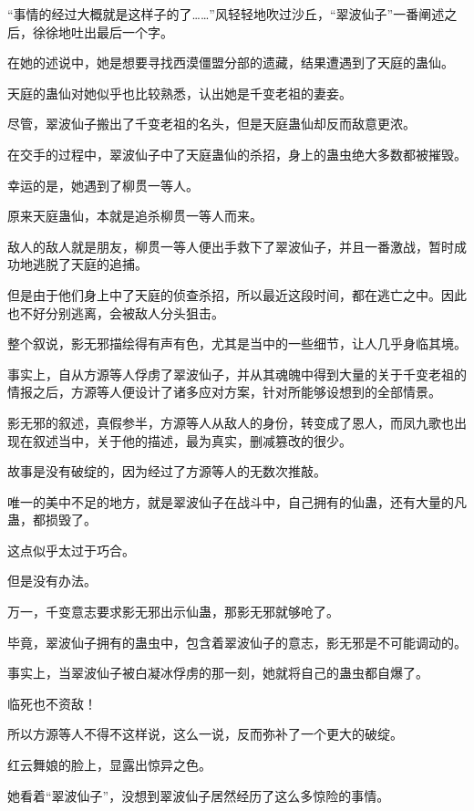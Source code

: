 
\begin{this_body}

“事情的经过大概就是这样子的了……”风轻轻地吹过沙丘，“翠波仙子”一番阐述之后，徐徐地吐出最后一个字。

在她的述说中，她是想要寻找西漠僵盟分部的遗藏，结果遭遇到了天庭的蛊仙。

天庭的蛊仙对她似乎也比较熟悉，认出她是千变老祖的妻妾。

尽管，翠波仙子搬出了千变老祖的名头，但是天庭蛊仙却反而敌意更浓。

在交手的过程中，翠波仙子中了天庭蛊仙的杀招，身上的蛊虫绝大多数都被摧毁。

幸运的是，她遇到了柳贯一等人。

原来天庭蛊仙，本就是追杀柳贯一等人而来。

敌人的敌人就是朋友，柳贯一等人便出手救下了翠波仙子，并且一番激战，暂时成功地逃脱了天庭的追捕。

但是由于他们身上中了天庭的侦查杀招，所以最近这段时间，都在逃亡之中。因此也不好分别逃离，会被敌人分头狙击。

整个叙说，影无邪描绘得有声有色，尤其是当中的一些细节，让人几乎身临其境。

事实上，自从方源等人俘虏了翠波仙子，并从其魂魄中得到大量的关于千变老祖的情报之后，方源等人便设计了诸多应对方案，针对所能够设想到的全部情景。

影无邪的叙述，真假参半，方源等人从敌人的身份，转变成了恩人，而凤九歌也出现在叙述当中，关于他的描述，最为真实，删减篡改的很少。

故事是没有破绽的，因为经过了方源等人的无数次推敲。

唯一的美中不足的地方，就是翠波仙子在战斗中，自己拥有的仙蛊，还有大量的凡蛊，都损毁了。

这点似乎太过于巧合。

但是没有办法。

万一，千变意志要求影无邪出示仙蛊，那影无邪就够呛了。

毕竟，翠波仙子拥有的蛊虫中，包含着翠波仙子的意志，影无邪是不可能调动的。

事实上，当翠波仙子被白凝冰俘虏的那一刻，她就将自己的蛊虫都自爆了。

临死也不资敌！

所以方源等人不得不这样说，这么一说，反而弥补了一个更大的破绽。

红云舞娘的脸上，显露出惊异之色。

她看着“翠波仙子”，没想到翠波仙子居然经历了这么多惊险的事情。


\end{this_body}
